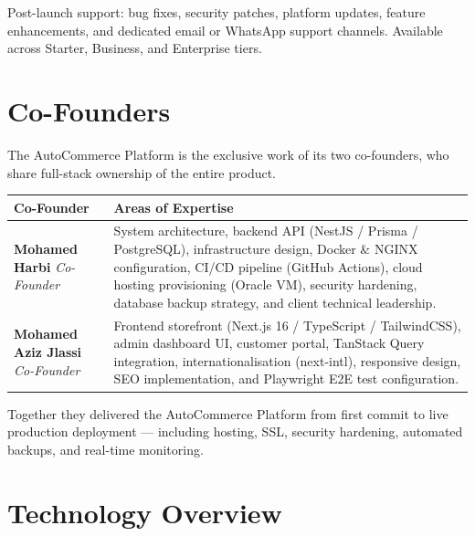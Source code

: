 \documentclass[11pt,a4paper]{article}
\begin{document}
Post-launch support: bug fixes, security patches, platform updates,
feature enhancements, and dedicated email or WhatsApp support
channels. Available across Starter, Business, and Enterprise tiers.

\section{Co-Founders}

The AutoCommerce Platform is the exclusive work of its two co-founders,
who share full-stack ownership of the entire product.

\begin{center}
\renewcommand{\arraystretch}{1.5}
\begin{tabular}{@{}p{4.5cm}p{10cm}@{}}
\toprule
\textbf{Co-Founder} & \textbf{Areas of Expertise} \\
\midrule
\textbf{Mohamed Harbi} \newline
\textit{Co-Founder} &
System architecture, backend API (NestJS / Prisma / PostgreSQL),
infrastructure design, Docker \& NGINX configuration, CI/CD
pipeline (GitHub Actions), cloud hosting provisioning (Oracle VM),
security hardening, database backup strategy, and client
technical leadership. \\[0.4em]
\textbf{Mohamed Aziz Jlassi} \newline
\textit{Co-Founder} &
Frontend storefront (Next.js 16 / TypeScript / TailwindCSS),
admin dashboard UI, customer portal, TanStack Query integration,
internationalisation (next-intl), responsive design, SEO
implementation, and Playwright E2E test configuration. \\
\bottomrule
\end{tabular}
\end{center}

\noindent Together they delivered the AutoCommerce Platform from first
commit to live production deployment --- including hosting, SSL,
security hardening, automated backups, and real-time monitoring.

\section{Technology Overview}
\end{document}

